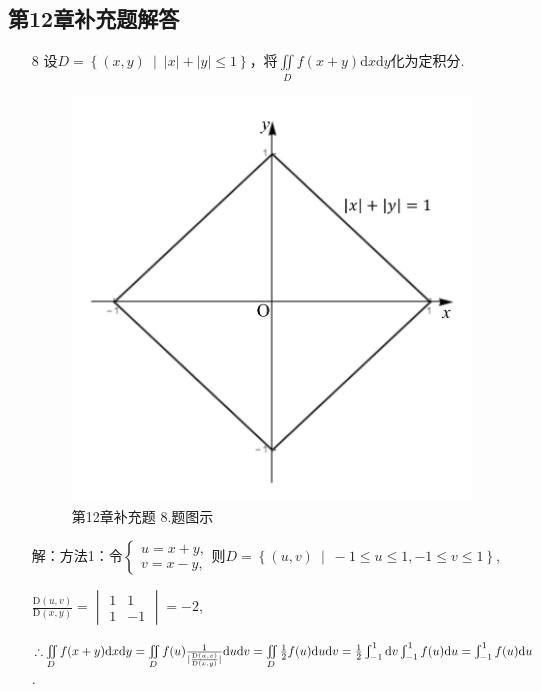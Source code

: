 \documentclass[12pt,UTF8]{ctexart}
\newcommand\Set[2]{\left\{#1\ \middle\vert\ #2 \right\}}
\newcommand{\Int}[4]{\varint\nolimits_{#1}^{#2}#3\mathrm d#4}
\newcommand{\varIInt}[4]{\iint\limits_{#1}#2\mathrm d#3\mathrm d#4}
\begin{document}
\subsection{第12章补充题解答}
\begin{enumerate}
\item[8]设$D=\Set{(x,y)}{|x|+|y|\leqslant1}$，将$\varIInt D{f(x+y)}xy$化为定积分.

\begin{figure}[H]
\begin{center}
\includegraphics[height=0.3\textheight]{Figures21/Fig12-C-8.pdf}
\end{center}
\caption{第12章补充题 8.题图示}
\label{12-C-8}
\end{figure}

解：方法1：令$\begin{cases}
u=x+y,\\
v=x-y,
\end{cases}$则$D=\Set{(u,v)}{-1\leqslant u\leqslant 1,-1\leqslant v\leqslant 1}$,

$\frac{\mathrm D(u,v)}{\mathrm D(x,y)}=\begin{vmatrix}
1&1\\
1&-1
\end{vmatrix}=-2$,

$\therefore\varIInt D{f(x+y)}xy=\varIInt D{f(u)\frac1{|\frac{\mathrm D(u,v)}{\mathrm D(x,y)}|}}uv=\varIInt D{\frac12f(u)}uv=\frac12\Int{-1}1{}v\Int{-1}1{f(u)}u\\
=\Int{-1}1{f(u)}u$.


\end{enumerate}
\end{document}
